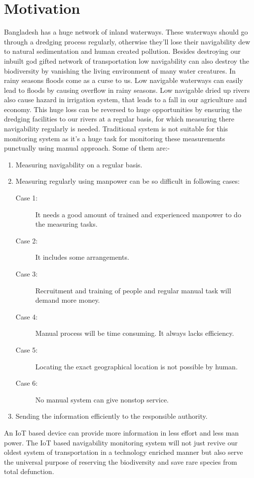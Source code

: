 \documentclass[12pt, top = 1 inch, bottom = 1 inch, left = 1.2 inch, top = .8 inch]{book}
\begin{document}
	\section{Motivation}
	Bangladesh has a huge network of inland waterways. These waterways should go through a dredging process regularly, otherwise they’ll lose their navigability dew to natural sedimentation and human created pollution. Besides destroying our inbuilt god gifted network of transportation low navigability can also destroy the biodiversity by vanishing the living environment of many water creatures. In rainy seasons floods come as a curse to us. Low navigable waterways can easily lead to floods by causing overflow in rainy seasons. Low navigable dried up rivers also cause hazard in irrigation system, that leads to a fall in our agriculture and economy.   
This huge loss can be reversed to huge opportunities by ensuring the dredging facilities to our rivers at a regular basis, for which measuring there navigability regularly is needed. Traditional system is not suitable for this monitoring system as it’s a huge task for monitoring these measurements punctually using manual approach. Some of them are:-
	\begin{enumerate}
	\item Measuring navigability on a regular basis.
	\item Measuring regularly using manpower can be so difficult in following cases:
		\begin{description}
			\item [Case 1:] It needs a good amount of trained and experienced manpower to do the measuring tasks.	
			\item [Case 2:] It includes some arrangements.
			\item [Case 3:] Recruitment and training of people and regular manual task will demand more money.
			\item [Case 4:] Manual process will be time consuming. It always lacks efficiency.
			\item [Case 5:] Locating the exact geographical location is not possible by human.
			\item [Case 6:] No manual system can give nonstop service.
		\end{description}
	\item Sending the information efficiently to the responsible authority.
	\end{enumerate}
 An IoT based device can provide more information in less effort and less man power. The IoT based navigability monitoring system will not just revive our oldest system of transportation in a technology enriched manner but also serve the universal purpose of reserving the biodiversity and save rare species from total defunction.
\end{document}
